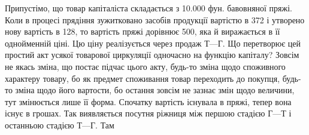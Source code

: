 \roztyagnut
Припустімо, що товар капіталіста складається з \num{10.000} фун. бавовняної
пряжі. Коли в процесі прядіння зужитковано засобів продукції вартістю
в 372 і утворено нову вартість в 128, то вартість
пряжі дорівнює 500, яка й виражається в її однойменній ціні.
Цю ціну реалізується через продаж $Т — Г$. Що перетворює цей простий
акт усякої товарової циркуляції одночасно на функцію капіталу? Зовсім
не якась зміна, що постає підчас цього акту, будь-то зміна щодо споживного
характеру товару, бо як предмет споживання товар переходить до покупця,
будь-то зміна щодо його вартости, бо остання зовсім не зазнає змін
щодо величини, тут змінюється лише її форма. Спочатку вартість існувала
в пряжі, тепер вона існує в грошах. Так виявляється посутня
ріжниця між першою стадією $Г — Т$
і останньою стадією $Т — Г$. Там
\parbreak{}  %

